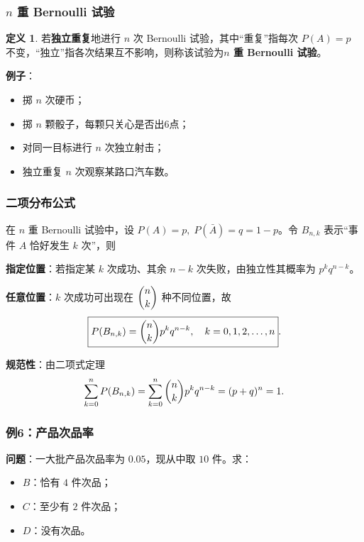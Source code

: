 \documentclass[11pt,a4paper]{report}
\theoremstyle{definition}
\newtheorem{definition}{定义}[chapter]
\begin{document}
\subsubsection{\texorpdfstring{$n$}{n} 重 Bernoulli 试验}

\begin{definition}
若\textbf{独立重复}地进行 $n$ 次 Bernoulli 试验，其中``重复''指每次 $P(A)=p$ 不变，``独立''指各次结果互不影响，则称该试验为\textbf{$n$ 重 Bernoulli 试验}。
\end{definition}

\textbf{例子}：
\begin{itemize}[leftmargin=2em]
    \item 掷 $n$ 次硬币；
    \item 掷 $n$ 颗骰子，每颗只关心是否出6点；
    \item 对同一目标进行 $n$ 次独立射击；
    \item 独立重复 $n$ 次观察某路口汽车数。
\end{itemize}

\subsubsection{二项分布公式}

在 $n$ 重 Bernoulli 试验中，设 $P(A)=p,\; P(\bar{A})=q=1-p$。令 $B_{n,k}$ 表示``事件 $A$ 恰好发生 $k$ 次''，则

\textbf{指定位置}：若指定某 $k$ 次成功、其余 $n-k$ 次失败，由独立性其概率为 $p^k q^{n-k}$。

\textbf{任意位置}：$k$ 次成功可出现在 $\dbinom{n}{k}$ 种不同位置，故
\[
\boxed{P(B_{n,k}) = \dbinom{n}{k} p^k q^{n-k}, \quad k=0,1,2,\dots,n}.
\]

\textbf{规范性}：由二项式定理
\[
\sum_{k=0}^{n} P(B_{n,k}) = \sum_{k=0}^{n} \dbinom{n}{k} p^k q^{n-k} = (p+q)^n = 1.
\]

\subsubsection{例6：产品次品率}

\textbf{问题}：一大批产品次品率为 $0.05$，现从中取 $10$ 件。求：
\begin{itemize}[leftmargin=2em]
    \item $B$：恰有 $4$ 件次品；
    \item $C$：至少有 $2$ 件次品；
    \item $D$：没有次品。
\end{itemize}
\end{document}
